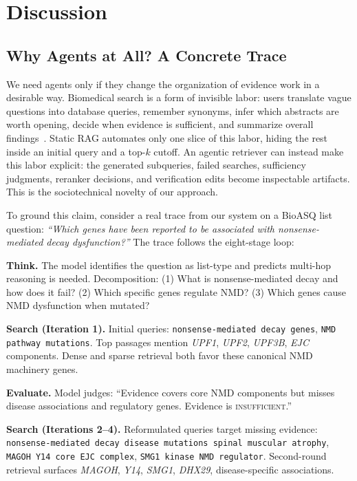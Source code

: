 \documentclass[sigconf,anonymous,review]{acmart}
\begin{document}
\section{Discussion}

\subsection{Why Agents at All? A Concrete Trace}

We need agents only if they change the organization of evidence work in a desirable way. Biomedical search is a form of invisible labor: users translate vague questions into database queries, remember synonyms, infer which abstracts are worth opening, decide when evidence is sufficient, and summarize overall findings~\cite{daei2020clinical}. Static RAG automates only one slice of this labor, hiding the rest inside an initial query and a top-$k$ cutoff. An agentic retriever can instead make this labor explicit: the generated subqueries, failed searches, sufficiency judgments, reranker decisions, and verification edits become inspectable artifacts. This is the sociotechnical novelty of our approach.

To ground this claim, consider a real trace from our system on a BioASQ list question: \emph{``Which genes have been reported to be associated with nonsense-mediated decay dysfunction?''} The trace follows the eight-stage loop:

\textbf{Think.} The model identifies the question as list-type and predicts multi-hop reasoning is needed. Decomposition: (1) What is nonsense-mediated decay and how does it fail? (2) Which specific genes regulate NMD? (3) Which genes cause NMD dysfunction when mutated?

\textbf{Search (Iteration 1).} Initial queries: \texttt{nonsense-mediated decay genes}, \texttt{NMD pathway mutations}. Top passages mention \textit{UPF1}, \textit{UPF2}, \textit{UPF3B}, \textit{EJC} components. Dense and sparse retrieval both favor these canonical NMD machinery genes.

\textbf{Evaluate.} Model judges: ``Evidence covers core NMD components but misses disease associations and regulatory genes. Evidence is \textsc{insufficient}.''

\textbf{Search (Iterations 2--4).} Reformulated queries target missing evidence: \texttt{nonsense-mediated decay disease mutations spinal muscular atrophy}, \texttt{MAGOH Y14 core EJC complex}, \texttt{SMG1 kinase NMD regulator}. Second-round retrieval surfaces \textit{MAGOH}, \textit{Y14}, \textit{SMG1}, \textit{DHX29}, disease-specific associations.
\end{document}

